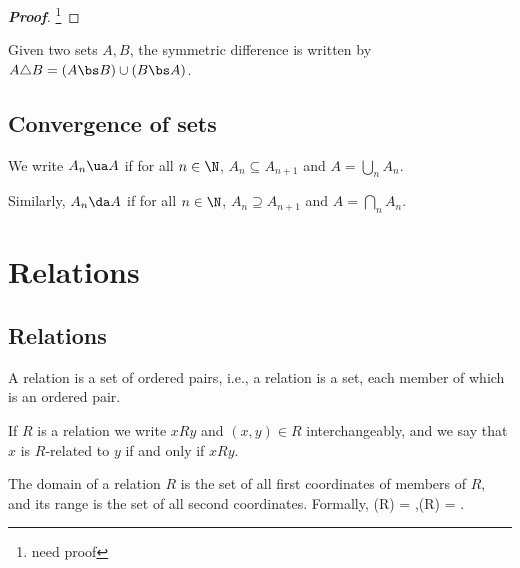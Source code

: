 \begin{proof}[\bf Proof]
\footnote{need proof}
\end{proof}





\begin{definition}\label{def:symmetric_difference}
Given two sets $A,B$, the symmetric difference is written by $A \triangle B = (A\bs B)\cup (B\bs A)$.
\end{definition}


\subsection{Convergence of sets}

\begin{definition}\label{def:monotone_convergence_sets}
We write $A_n\ua A$ if for all $n\in \N$, $A_n \subseteq A_{n+1}$ and $A = \bigcup_n A_n$.

Similarly, $A_n \da A$ if for all $n\in \N$, $A_n \supseteq A_{n+1}$ and $A = \bigcap_n A_n$.
\end{definition}

\section{Relations}


\subsection{Relations}

\begin{definition}\label{def:relation}
A relation is a set of ordered pairs, i.e., a relation is a set, each member of which is an ordered pair.

If $R$ is a relation we write $xRy$ and $(x,y)\in R$ interchangeably, and we say that $x$ is $R$-related to $y$ if and only if $xRy$.
\end{definition}


\begin{definition}\label{def:domain_range_relation}
The domain of a relation $R$ is the set of all first coordinates of members of $R$, and its range is the set of all second coordinates. Formally,
\be
{}(R) = ,\qquad {}(R) = .
\ee
\end{definition}

